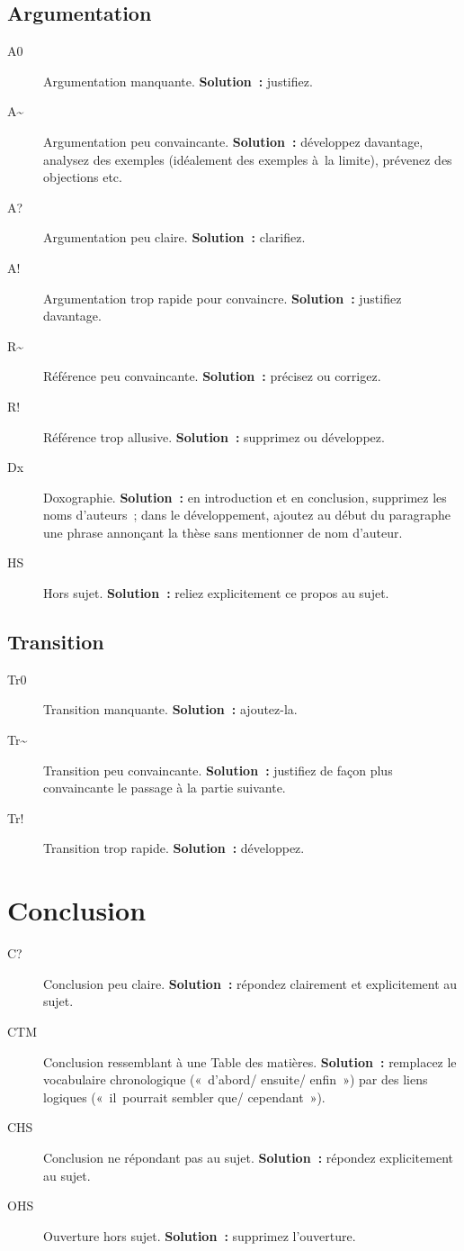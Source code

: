 \documentclass[a4paper,11pt]{article}
\begin{document}
\subsection{Argumentation}
\label{sec:org5616f63}
\begin{description}
\item[{A0}] Argumentation manquante. \textbf{Solution :} justifiez.
\item[{A\textasciitilde{}}] Argumentation peu convaincante. \textbf{Solution :} développez
davantage, analysez des exemples (idéalement des exemples à la
limite), prévenez des objections etc.
\item[{A\string?}] Argumentation peu claire. \textbf{Solution :} clarifiez.
\item[{A\string!}] Argumentation trop rapide pour convaincre. \textbf{Solution :}
justifiez davantage.
\item[{R\textasciitilde{}}] Référence peu convaincante. \textbf{Solution :} précisez ou corrigez.
\item[{R\string!}] Référence trop allusive. \textbf{Solution :} supprimez ou
développez.
\item[{Dx}] Doxographie. \textbf{Solution :} en introduction et en conclusion,
supprimez les noms d'auteurs ; dans le développement, ajoutez au début
du paragraphe une phrase annonçant la thèse sans mentionner de nom
d'auteur.
\item[{HS}] Hors sujet. \textbf{Solution :} reliez explicitement ce propos au
sujet.
\end{description}

\subsection{Transition}
\label{sec:org75fc751}
\begin{description}
\item[{Tr0}] Transition manquante. \textbf{Solution :} ajoutez-la.
\item[{Tr\textasciitilde{}}] Transition peu convaincante. \textbf{Solution :} justifiez de façon
plus convaincante le passage à la partie suivante.
\item[{Tr\string!}] Transition trop rapide. \textbf{Solution :} développez.
\end{description}

\section{Conclusion}
\label{sec:org7ec308b}
\begin{description}
\item[{C\string?}] Conclusion peu claire. \textbf{Solution :} répondez clairement
et explicitement au sujet.
\item[{CTM}] Conclusion ressemblant à une Table des matières. \textbf{Solution :}
remplacez le vocabulaire chronologique (« d'abord/ ensuite/
enfin ») par des liens logiques (« il pourrait sembler que/
cependant »).
\item[{CHS}] Conclusion ne répondant pas au sujet. \textbf{Solution :} répondez
explicitement au sujet.
\item[{OHS}] Ouverture hors sujet. \textbf{Solution :} supprimez l'ouverture.
\end{description}
\end{document}
